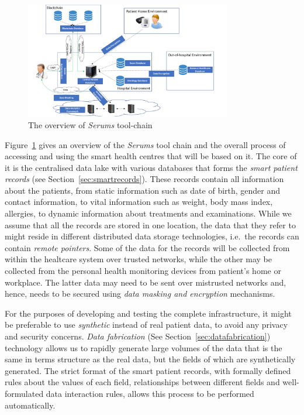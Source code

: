 \begin{figure}[ht!]
    \centering
    \includegraphics[width=90mm]{images/SerumsOverview.pdf}
    \caption{The overview of \emph{Serums} tool-chain}
    \label{fig:serumsTools}
\end{figure}

\noindent Figure~\ref{fig:serumsTools} gives an overview of the \emph{Serums} tool chain and the overall process of accessing and using the smart health centres that will be based on it. The core of it is the centralised data lake with various databases that forms the \emph{smart patient records} (see Section~\ref{sec:smartrecords}). These records contain all information about the patients, from static information such as date of birth, gender and contact information, to vital information such as weight, body mass index, allergies, to dynamic information about treatments and examinations. While we assume that all the records are stored in one location, the data that they refer to might reside in different distributed data storage technologies, i.e.~the records can contain \emph{remote pointers}. Some of the data for the records will be collected from within the healtcare system over trusted networks, while the other may be collected from the personal health monitoring devices from patient's home or workplace. The latter data may need to be sent over mistrusted networks and, hence, needs to be secured using \emph{data masking and encryption} mechanisms.

For the purposes of developing and testing the complete infrastructure, it might be preferable to use \emph{synthetic} instead of real patient data, to avoid any privacy and security concerns. \emph{Data fabrication} (See Section~\ref{sec:datafabrication}) technology allows us to rapidly generate large volumes of the data that is the same in terms structure as the real data, but the fields of which are synthetically generated. The strict format of the smart patient records, with formally defined rules about the values of each field, relationships between different fields and well-formulated data interaction rules, allows this process to be performed automatically. 

